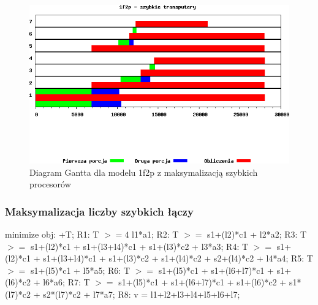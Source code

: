 \documentclass[a4paper,11pt, titlepage]{article}
\begin{document}
\begin{figure}[htp!]
\includegraphics[width=1.0\textwidth]{wykresy/2p1f_proc}
\caption{Diagram Gantta dla modelu 1f2p z maksymalizacją szybkich procesorów \label{2p1f_p}}
\end{figure}

\subsubsection{Maksymalizacja liczby szybkich łączy}
\begin{flushleft}

minimize obj: +T;\linebreak
\linebreak
R1: T $>=4$ l1*a1;\linebreak
R2: T $>=$ s1+(l2)*c1 + l2*a2;\linebreak
R3: T $>=$ s1+(l2)*c1 + s1+(l3+l4)*c1 + s1+(l3)*c2 + l3*a3;\linebreak
R4: T $>=$ s1+(l2)*c1 + s1+(l3+l4)*c1 + s1+(l3)*c2 + s1+(l4)*c2 + s2+(l4)*c2 + l4*a4;\linebreak
R5: T $>=$ s1+(l5)*c1 + l5*a5;\linebreak
R6: T $>=$ s1+(l5)*c1 + s1+(l6+l7)*c1 + s1+(l6)*c2 + l6*a6;\linebreak
R7: T $>=$ s1+(l5)*c1 + s1+(l6+l7)*c1 + s1+(l6)*c2 + s1*(l7)*c2 + s2*(l7)*c2 + l7*a7;\linebreak
R8: v = l1+l2+l3+l4+l5+l6+l7;\linebreak
\end{flushleft}
\end{document}
